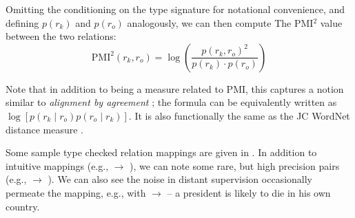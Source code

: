 Omitting the conditioning on the type signature for notational convenience,
  and defining $p(r_k)$ and $p(r_o)$ analogously,
  we can then compute The PMI$^2$ value between the two relations:
\begin{equation*}
  \textrm{PMI}^2(r_k, r_o) = \log \left( \frac{p(r_k, r_o)^2}{p(r_k) \cdot p(r_o)} \right)
\end{equation*}

Note that in addition to being a measure related to PMI, this captures
  a notion similar to \textit{alignment by agreement} 
  \cite{key:2006liang-alignment};
  the formula can be equivalently written as 
  $\log \left[ p(r_k \mid r_o) p(r_o \mid r_k)\right]$.
It is also functionally the same as the JC WordNet distance measure
  \cite{key:1997jc-similarity}.

Some sample type checked relation mappings are given in .
In addition to intuitive mappings (e.g.,  $\rightarrow$ 
  ), we can note some rare, but high precision pairs
  (e.g.,  $\rightarrow$ ).
We can also see the noise in distant supervision occasionally permeate 
  the mapping, e.g., with  $\rightarrow$ 
  -- a president is likely to die in his own country.


  


